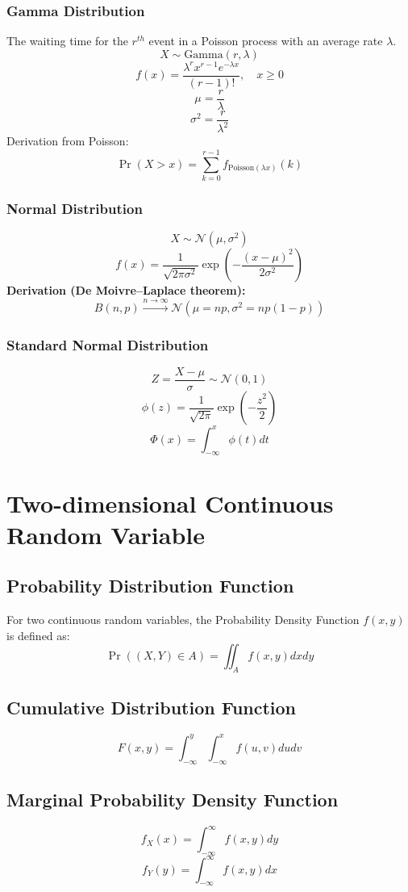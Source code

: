 \documentclass{article}
\begin{document}
\subsubsection{Gamma Distribution}
The waiting time for the \( r^{th} \) event in a Poisson process with an average rate \( \lambda \).
\[ X \sim \mathrm{Gamma}(r, \lambda) \]
\[
    f(x) = \frac{\lambda^r x^{r-1} e^{-\lambda x}}{(r-1)!}, \quad x \geq 0
\]
\[
    \mu = \frac{r}{\lambda}
\]
\[
    \sigma^2 = \frac{r}{\lambda^2}
\]
Derivation from Poisson:
\[
    \Pr(X > x) = \sum_{k=0}^{r-1} f_{\text{Poisson}(\lambda x)}(k)
\]

\subsubsection{Normal Distribution}
\[ X \sim \mathcal{N}(\mu, \sigma^2) \]
\[
    f(x) = \frac{1}{\sqrt{2\pi\sigma^2}} \exp\left( -\frac{(x-\mu)^2}{2\sigma^2} \right)
\]
\textbf{Derivation (De Moivre–Laplace theorem):}
\[
    B(n, p) \xrightarrow{n \to \infty} \mathcal{N}(\mu = np, \sigma^2 = np(1-p))
\]

\subsubsection{Standard Normal Distribution}
\[ Z = \frac{X-\mu}{\sigma} \sim \mathcal{N}(0,1) \]
\[
    \phi(z) = \frac{1}{\sqrt{2\pi}} \exp\left( -\frac{z^2}{2} \right)
\]
\[
    \Phi(x) = \int_{-\infty}^{x} \phi(t)dt
\]

\newpage
\section{Two-dimensional Continuous Random Variable}

\subsection{Probability Distribution Function}
For two continuous random variables, the Probability Density Function \( f(x,y) \) is defined as:
\[
    \Pr((X,Y) \in A) = \iint_{A} f(x,y) dx dy
\]

\subsection{Cumulative Distribution Function}
\[
    F(x,y) = \int_{-\infty}^{y} \int_{-\infty}^{x} f(u,v) du dv
\]

\subsection{Marginal Probability Density Function}
\[
    f_X(x) = \int_{-\infty}^{\infty} f(x,y)dy
\]
\[
    f_Y(y) = \int_{-\infty}^{\infty} f(x,y)dx
\]
\end{document}
